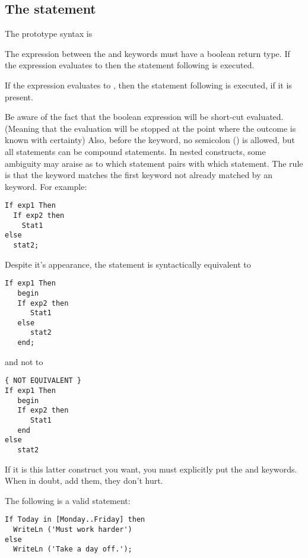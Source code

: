 \documentclass{report}
\begin{document}
\subsection{The  statement}
The  prototype syntax is

The expression between the  and  keywords must have a
boolean return type. If the expression evaluates to  then the
statement following  is executed. 

If the expression evaluates to , then the statement following 
 is executed, if it is present.

Be aware of the fact that the boolean expression will be short-cut evaluated.
(Meaning that the evaluation will be stopped at the point where the
 outcome is known with certainty)
Also, before the  keyword,  no semicolon (\var{;}) is allowed,
but all statements can be compound statements.
In nested  constructs, some ambiguity may araise as
to which   statement pairs with which  statement. The rule
is that the  keyword matches the first  keyword not
already matched by an  keyword.
For example:
\begin{verbatim}
If exp1 Then
  If exp2 then
    Stat1
else
  stat2;
\end{verbatim}
Despite it's appearance, the statement is syntactically equivalent to
\begin{verbatim}
If exp1 Then
   begin
   If exp2 then
      Stat1
   else
      stat2
   end;
\end{verbatim}
and not to
\begin{verbatim}
{ NOT EQUIVALENT }
If exp1 Then
   begin
   If exp2 then
      Stat1
   end
else
   stat2
\end{verbatim}
If it is this latter construct you want, you must explicitly put the
 and  keywords. When in doubt, add them, they don't
hurt.

The following is a valid statement:
\begin{verbatim}
If Today in [Monday..Friday] then
  WriteLn ('Must work harder')
else
  WriteLn ('Take a day off.');
\end{verbatim}
\end{document}
